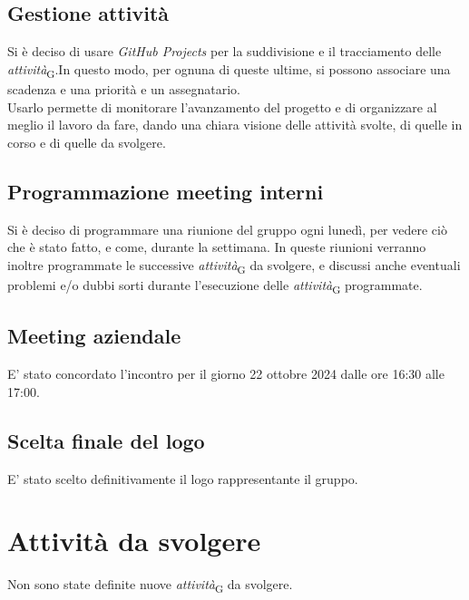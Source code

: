 \documentclass{article}
\begin{document}
    \subsection{Gestione attività}
    Si è deciso di usare \textit{GitHub Projects} per la suddivisione e il tracciamento delle \textit{attività}\textsubscript{G}.In questo modo, per ognuna di queste ultime, si possono associare una scadenza e una priorità e un assegnatario.\\
    Usarlo permette di monitorare l’avanzamento del progetto e di organizzare al meglio il lavoro da fare, dando una chiara visione delle attività svolte, di quelle in corso e di quelle da svolgere.
    \subsection{Programmazione meeting interni}
    Si è deciso di programmare una riunione del gruppo ogni lunedì, per vedere ciò che è stato fatto, e come, durante la settimana. In queste riunioni verranno inoltre programmate le successive \textit{attività}\textsubscript{G} da svolgere, e discussi anche eventuali problemi e/o dubbi sorti durante l'esecuzione delle \textit{attività}\textsubscript{G} programmate.
    \subsection{Meeting aziendale}
    E’ stato concordato l’incontro per il giorno 22 ottobre 2024 dalle ore 16:30 alle 17:00.
    \subsection{Scelta finale del logo}
    E’ stato scelto definitivamente il logo rappresentante il gruppo.

\section{Attività da svolgere}
Non sono state definite nuove \textit{attività}\textsubscript{G} da svolgere.
\end{document}
